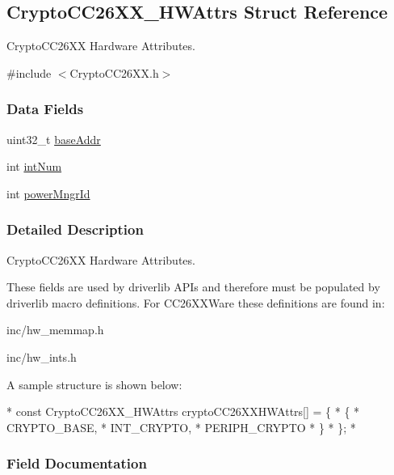 \subsection{Crypto\-C\-C26\-X\-X\-\_\-\-H\-W\-Attrs Struct Reference}
\label{struct_crypto_c_c26_x_x___h_w_attrs}


Crypto\-C\-C26\-X\-X Hardware Attributes.  




{\ttfamily \#include $<$Crypto\-C\-C26\-X\-X.\-h$>$}

\subsubsection*{Data Fields}
\begin{DoxyCompactItemize}
\item 
uint32\-\_\-t \hyperlink{struct_crypto_c_c26_x_x___h_w_attrs_a8a6e2dbc65c24f641941ebe3c854e961}{base\-Addr}
\item 
int \hyperlink{struct_crypto_c_c26_x_x___h_w_attrs_a63cdd84637d1e9acca0315cd96d9891b}{int\-Num}
\item 
int \hyperlink{struct_crypto_c_c26_x_x___h_w_attrs_ac5c27633092355d3606d6d0b240b2091}{power\-Mngr\-Id}
\end{DoxyCompactItemize}


\subsubsection{Detailed Description}
Crypto\-C\-C26\-X\-X Hardware Attributes. 

These fields are used by driverlib A\-P\-Is and therefore must be populated by driverlib macro definitions. For C\-C26\-X\-X\-Ware these definitions are found in\-:
\begin{DoxyItemize}
\item inc/hw\-\_\-memmap.\-h
\item inc/hw\-\_\-ints.\-h
\end{DoxyItemize}

A sample structure is shown below\-: 
\begin{DoxyCode}
*  \textcolor{keyword}{const} CryptoCC26XX_HWAttrs cryptoCC26XXHWAttrs[] = \{
*      \{
*          CRYPTO\_BASE,
*          INT\_CRYPTO,
*          PERIPH\_CRYPTO
*      \}
*  \};
*  
\end{DoxyCode}
 

\subsubsection{Field Documentation}
